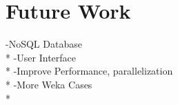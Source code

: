 \section{Future Work}
\label{sect:future-work}
-NoSQL Database\\*
-User Interface\\*
-Improve Performance, parallelization\\*
-More Weka Cases\\*

